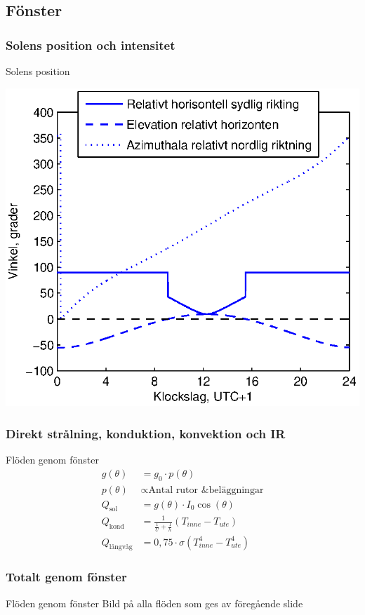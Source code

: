\subsection{Fönster}

\subsubsection{Solens position och intensitet}
\begin{frame}{Solens position}
  \begin{center}
  \includegraphics[scale=0.8]{images/sunposition1231.eps}
  \end{center}
\end{frame}

\subsubsection{Direkt strålning, konduktion, konvektion och IR}
\begin{frame}{Flöden genom fönster}
  \begin{align*}
    g\left( \theta \right) & = g_0 \cdot p\left( \theta \right)\\[10pt]
    p\left( \theta \right) & \propto \text{Antal rutor \& beläggningar}\\[10pt]
    Q_{\text{sol}} \,\,\,\, & = g\left( \theta \right) \cdot I_0 \cos{\left( \theta \right)}\\[10pt]
    Q_{\text{kond}} & = \frac{1}{\frac{1}{U}+\frac{1}{h}} \left( T_{inne} - T_{ute}\right)\\[10pt]
    Q_{\text{långvåg}} & = 0,75 \cdot \sigma \left( T_{inne}^4 - T_{ute}^4\right)
  \end{align*}
\end{frame}


\subsubsection{Totalt genom fönster}
\begin{frame}{Flöden genom fönster}
  Bild på alla flöden som ges av föregående slide
\end{frame}
